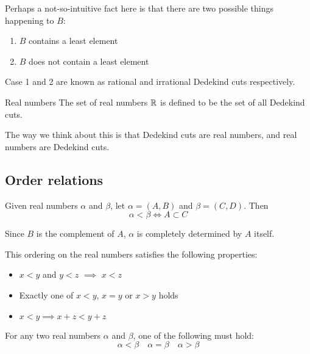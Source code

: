 Perhaps a not-so-intuitive fact here is that there are two possible things happening to $B$:
\begin{enumerate}
\item $B$ contains a least element
\item $B$ does not contain a least element
\end{enumerate}
Case 1 and 2 are known as rational and irrational Dedekind cuts respectively.

\begin{defn}{Real numbers}{} 
The set of real numbers $\mathbb R$ is defined to be the set of all Dedekind cuts.
\end{defn}

\begin{remark}
The way we think about this is that Dedekind cuts are real numbers, and real numbers are Dedekind cuts.
\end{remark}
\pagebreak

\subsection{Order relations}
Given real numbers $\alpha$ and $\beta$, let $\alpha = (A,B)$ and $\beta = (C,D)$. Then
\[ \alpha < \beta \iff A \subset C \]
\begin{remark}
Since $B$ is the complement of $A$, $\alpha$ is completely determined by $A$ itself.
\end{remark}

This ordering on the real numbers satisfies the following properties:
\begin{itemize}
\item $x<y$ and $y<z$ $\implies$ $x<z$
\item Exactly one of $x<y$, $x=y$ or $x>y$ holds
\item $x<y \implies x+z<y+z$
\end{itemize}

\begin{property}[Ordering]
For any two real numbers $\alpha$ and $\beta$, one of the following must hold:
\[ \alpha < \beta \quad \alpha = \beta \quad \alpha > \beta \]
\end{property}

